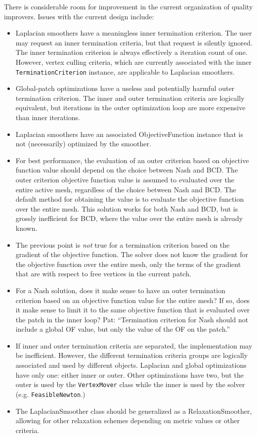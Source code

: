 \documentclass{article}
\begin{document}
There is considerable room for improvement in the current organization of quality improvers.  Issues with the current design include:
\begin{itemize}
\item Laplacian smoothers have a meaningless inner termination criterion.  The user may request an inner termination criteria, but that request is silently ignored.  The inner termination criterion is always effectively a iteration count of one.  However, vertex culling criteria, which are currently associated with the inner \texttt{TerminationCriterion} instance, are applicable to Laplacian smoothers.
\item Global-patch optimizations have a useless and potentially harmful outer termination criterion.  The inner and outer termination criteria are logically equivalent, but iterations in the outer optimization loop are more expensive than inner iterations.
\item Laplacian smoothers have an associated ObjectiveFunction instance that is not (necessarily) optimized by the smoother.
\item For best performance, the evaluation of an outer criterion based on objective function value should depend on the choice between Nash and BCD.  The outer criterion objective function value is assumed to evaluated over the entire active mesh, regardless of the choice between Nash and BCD.  The default method for obtaining the value is to evaluate the objective function over the entire mesh.  This solution works for both Nash and BCD, but is grossly inefficient for BCD, where the value over the entire mesh is already known.
\item The previous point is \emph{not} true for a termination criterion based on the gradient of the objective function.  The solver does not know the gradient for the objective function over the entire mesh, only the terms of the gradient that are with respect to free vertices in the current patch.
\item For a Nash solution, does it make sense to have an outer termination criterion based on an objective function value for the entire mesh?  If so, does it make sense to limit it to the same objective function that is evaluated over the patch in the inner loop?  Pat: ``Termination criterion for Nash should not include a global OF value, but only the value of the OF on the patch.''
\item If inner and outer termination criteria are separated, the implementation may be inefficient.  However, the different termination criteria groups are logically associated and used by different objects.  Laplacian and global optimizations have only one: either inner or outer.  Other optimizations have two, but the outer is used by the \texttt{VertexMover} class while the inner is used by the solver (e.g. \texttt{FeasibleNewton}.)
\item The LaplacianSmoother class should be generalized as a RelaxationSmoother,
allowing for other relaxation schemes depending on metric values or other criteria.
\end{itemize}
\end{document}
